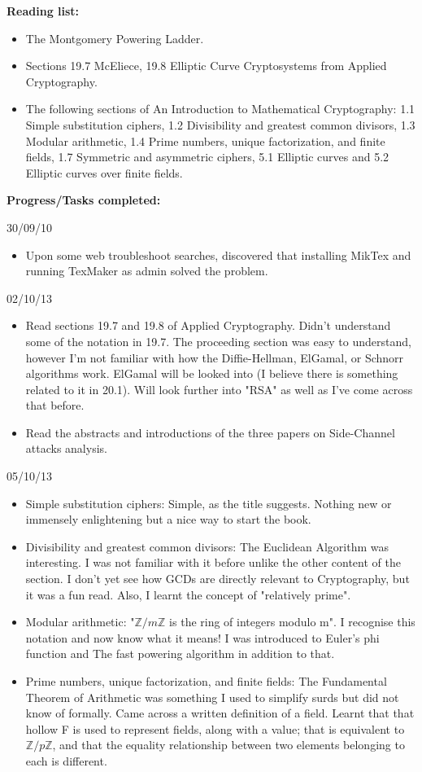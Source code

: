 \documentclass[a4paper, 10pt, envcountsect, runningheads]{article}
\newcommand{\Z}{\mathbb{Z}}
\begin{document}
\textbf{Reading list:}
\begin{itemize}
\item The Montgomery Powering Ladder.
\item Sections 19.7 McEliece, 19.8 Elliptic Curve Cryptosystems from Applied Cryptography.
\item The following sections of An Introduction to Mathematical Cryptography: 1.1 Simple substitution ciphers, 1.2 Divisibility and greatest common divisors, 1.3 Modular arithmetic, 1.4 Prime numbers, unique factorization,
and finite fields, 1.7 Symmetric and asymmetric ciphers, 5.1 Elliptic curves and 5.2 Elliptic curves over finite fields.
\end{itemize}

\textbf{Progress/Tasks completed:}

30/09/10
\begin{itemize}
\item Upon some web troubleshoot searches, discovered that installing MikTex and running TexMaker as admin solved the problem.
\end{itemize}

02/10/13
\begin{itemize}
\item Read sections 19.7 and 19.8 of Applied Cryptography. Didn't understand some of the notation in 19.7. The proceeding section was easy to understand, however I'm not familiar with how the Diffie-Hellman, ElGamal, or Schnorr algorithms work. ElGamal will be looked into (I believe there is something related to it in 20.1). Will look further into "RSA" as well as I've come across that before.
\item Read the abstracts and introductions of the three papers on Side-Channel attacks analysis.
\end{itemize}

05/10/13
\begin{itemize}
\item Simple substitution ciphers: Simple, as the title suggests. Nothing new or immensely enlightening but a nice way to start the book. 
\item Divisibility and greatest common divisors: The Euclidean Algorithm was interesting. I was not familiar with it before unlike the other content of the section. I don't yet see how GCDs are directly relevant to Cryptography, but it was a fun read. Also, I learnt the concept of "relatively prime".
\item Modular arithmetic: "$\Z/m\Z$ is the ring of integers modulo m". I recognise this notation and now know what it means! I was introduced to Euler’s phi function and The fast powering algorithm in addition to that.
\item Prime numbers, unique factorization,
and finite fields: The Fundamental Theorem of Arithmetic was something I used to simplify surds but did not know of formally. Came across a written definition of a field. Learnt that that hollow F is used to represent fields, along with a value; that is equivalent to $\Z/p\Z$, and that the equality relationship between two elements belonging to each is different.
\end{itemize}
\end{document}

